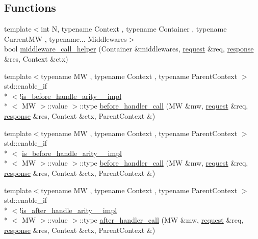 \subsection*{Functions}
\begin{DoxyCompactItemize}
\item 
{\footnotesize template$<$int N, typename Context , typename Container , typename Current\-M\-W , typename... Middlewares$>$ }\\bool \hyperlink{namespacecrow_1_1detail_a7e6d675c647354299b56961f649b346b}{middleware\-\_\-call\-\_\-helper} (Container \&middlewares, \hyperlink{structcrow_1_1request}{request} \&req, \hyperlink{structcrow_1_1response}{response} \&res, Context \&ctx)
\item 
{\footnotesize template$<$typename M\-W , typename Context , typename Parent\-Context $>$ }\\std\-::enable\-\_\-if\\*
$<$!\hyperlink{structcrow_1_1detail_1_1is__before__handle__arity__3__impl}{is\-\_\-before\-\_\-handle\-\_\-arity\-\_\-\_\-impl}\\*
$<$ M\-W $>$\-::value $>$\-::type \hyperlink{namespacecrow_1_1detail_a539974bbd5c715dda9a318aaf63cf0f2}{before\-\_\-handler\-\_\-call} (M\-W \&mw, \hyperlink{structcrow_1_1request}{request} \&req, \hyperlink{structcrow_1_1response}{response} \&res, Context \&ctx, Parent\-Context \&)
\item 
{\footnotesize template$<$typename M\-W , typename Context , typename Parent\-Context $>$ }\\std\-::enable\-\_\-if\\*
$<$ \hyperlink{structcrow_1_1detail_1_1is__before__handle__arity__3__impl}{is\-\_\-before\-\_\-handle\-\_\-arity\-\_\-\_\-impl}\\*
$<$ M\-W $>$\-::value $>$\-::type \hyperlink{namespacecrow_1_1detail_aa08db03a6d03728487a623804fc2d237}{before\-\_\-handler\-\_\-call} (M\-W \&mw, \hyperlink{structcrow_1_1request}{request} \&req, \hyperlink{structcrow_1_1response}{response} \&res, Context \&ctx, Parent\-Context \&)
\item 
{\footnotesize template$<$typename M\-W , typename Context , typename Parent\-Context $>$ }\\std\-::enable\-\_\-if\\*
$<$!\hyperlink{structcrow_1_1detail_1_1is__after__handle__arity__3__impl}{is\-\_\-after\-\_\-handle\-\_\-arity\-\_\-\_\-impl}\\*
$<$ M\-W $>$\-::value $>$\-::type \hyperlink{namespacecrow_1_1detail_a5608f0d89a16e2ba0fe1665ce5010008}{after\-\_\-handler\-\_\-call} (M\-W \&mw, \hyperlink{structcrow_1_1request}{request} \&req, \hyperlink{structcrow_1_1response}{response} \&res, Context \&ctx, Parent\-Context \&)

\end{DoxyCompactItemize}
